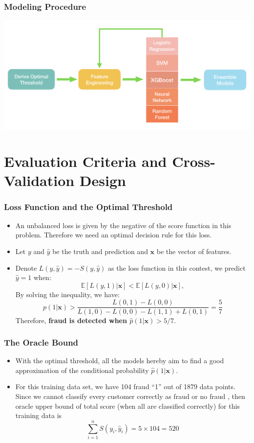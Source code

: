 \documentclass{beamer}
\begin{document}
\begin{frame}
\frametitle{Modeling Procedure}
    \includegraphics[width = \textwidth]{figure/FlowChart.png}
\end{frame}
\section{Evaluation Criteria and Cross-Validation Design}



\begin{frame}
\frametitle{{Loss Function and the Optimal Threshold}}
    \begin{itemize}
        \item 
        An unbalanced loss is given by the negative of the score function in this problem. Therefore we need an optimal decision rule for this loss. 
        \item  Let $y$ and $\hat{y}$ be the truth and prediction and $\pmb{x}$ be the vector of features. 
        \item Denote $L(y, \hat{y}) = - S(y, \hat{y})$ as the loss function in this contest,  we predict $\hat{y}=1$ when: 
  $$\mathbb{E}[{L}({y}, 1) | \pmb{x}]<\mathbb{E}[{L}({y}, 0) | \pmb{x}],$$
By solving the inequality, we have:
$$
{p}(1 | \pmb{x})>\frac{{L}(0,1)-{L}(0,0)}{{L}(1,0)-{L}(0,0)-{L}(1,1)+{L}(0,1)} = \frac{5}{7}
$$
Therefore, \textbf{fraud is detected when ${\hat{p}(1|\pmb{x})>5/7}$}.
    
    \end{itemize}

   
    
\end{frame}

\begin{frame}
    \frametitle{The Oracle Bound}
\begin{itemize}
    \item With the optimal threshold, all the models hereby aim to find a good approximation of the conditional probability $\hat{p}(1|\pmb{x})$.
    \item For this training data set, we have 104 fraud “1” out of 1879 data points. Since we cannot classify every customer correctly as fraud or no fraud , then oracle upper bound of total score (when all are classified correctly) for this training data is
    \[\sum_{i=1}^n S(y_i, \hat{y}_i) = 5 \times 104 = 520\]
\end{itemize}
\end{frame}
\end{document}
